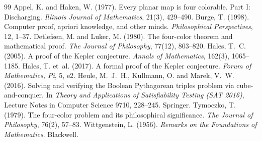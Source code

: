 \documentclass{situationist-preprint}
\begin{document}
\begin{thebibliography}{99}\small
{} Appel, K. and Haken, W. (1977). Every planar map is four colorable. Part I: Discharging. \emph{Illinois Journal of Mathematics}, 21(3), 429--490.
 Burge, T. (1998). Computer proof, apriori knowledge, and other minds. \emph{Philosophical Perspectives}, 12, 1--37.
 Detlefsen, M. and Luker, M. (1980). The four-color theorem and mathematical proof. \emph{The Journal of Philosophy}, 77(12), 803--820.
 Hales, T.~C. (2005). A proof of the Kepler conjecture. \emph{Annals of Mathematics}, 162(3), 1065--1185.
 Hales, T. et~al. (2017). A formal proof of the Kepler conjecture. \emph{Forum of Mathematics, Pi}, 5, e2.
 Heule, M.~J.~H., Kullmann, O. and Marek, V.~W. (2016). Solving and verifying the Boolean Pythagorean triples problem via cube-and-conquer. In \emph{Theory and Applications of Satisfiability Testing (SAT 2016)}, Lecture Notes in Computer Science 9710, 228--245. Springer.
 Tymoczko, T. (1979). The four-color problem and its philosophical significance. \emph{The Journal of Philosophy}, 76(2), 57--83.
 Wittgenstein, L. (1956). \emph{Remarks on the Foundations of Mathematics}. Blackwell.
\end{thebibliography}
\end{document}
